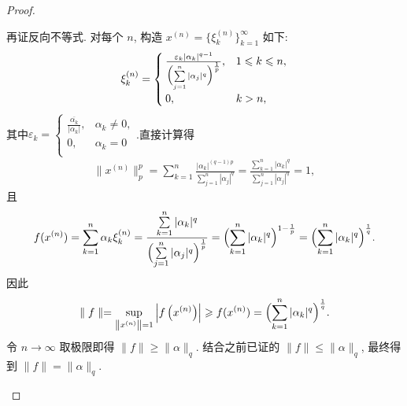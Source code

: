 \documentclass[../../main.tex]{subfiles}%
\begin{document}
\begin{proof}
\begin{enumerate}[(1)]
再证反向不等式. 对每个 $n$, 构造 $x^{(n)}=\{\xi_k^{(n)}\}_{k=1}^{\infty}$ 如下:
\begin{align*}
\xi_k^{(n)}=
\begin{cases}
\frac{\varepsilon_k|\alpha_k|^{q-1}}{\Bigl(\sum\limits_{j=1}^{n}|\alpha_j|^q\Bigr)^{\frac{1}{p}}}, & 1\leqslant k\leqslant n,\\[4pt]
0, & k>n,
\end{cases}
\end{align*}
其中$\varepsilon _k=\begin{cases}
\frac{\overline{\alpha _k}}{|\alpha _k|},&\alpha _k\ne 0,\\
0,&\alpha _k=0\\
\end{cases}$.直接计算得
\begin{align*}
\|x^{(n)}\|_p^p=\sum\limits_{k=1}^{n}\frac{|\alpha_k|^{(q-1)p}}{\sum\limits_{j=1}^{n}|\alpha_j|^q}
=\frac{\sum\limits_{k=1}^{n}|\alpha_k|^q}{\sum\limits_{j=1}^{n}|\alpha_j|^q}=1,
\end{align*}
且
\begin{align*}
f(x^{(n)})=\sum\limits_{k=1}^{n}\alpha_k\xi_k^{(n)}
=\frac{\sum\limits_{k=1}^{n}|\alpha_k|^q}{\Bigl(\sum\limits_{j=1}^{n}|\alpha_j|^q\Bigr)^{\frac{1}{p}}}
=\Bigl(\sum\limits_{k=1}^{n}|\alpha_k|^q\Bigr)^{1-\frac{1}{p}}
=\Bigl(\sum\limits_{k=1}^{n}|\alpha_k|^q\Bigr)^{\frac{1}{q}}.
\end{align*}
因此
\begin{align*}
\parallel f\parallel =\underset{\left\| x^{\left( n \right)} \right\| =1}{\mathrm{sup}}\left| f\left( x^{\left( n \right)} \right) \right|\geqslant f(x^{(n)})=\Bigl( \sum_{k=1}^n{|\alpha _k|^q} \Bigr) ^{\frac{1}{q}}.
\end{align*}
令 $n\to\infty$ 取极限即得 $\|f\|\geqslant \|\alpha\|_q$. 结合之前已证的 $\|f\|\leqslant \|\alpha\|_q$, 最终得到 $\|f\|=\|\alpha\|_q$.
\end{enumerate}
\end{proof}
\end{document}

